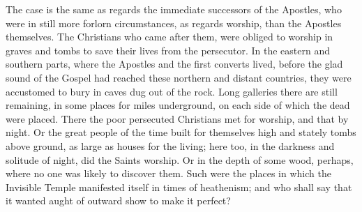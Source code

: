 The case is the same as regards the immediate successors of the
Apostles, who were in still more forlorn circumstances, as regards
worship, than the Apostles themselves. The Christians who came after
them, were obliged to worship in graves and tombs to save their lives
from the persecutor. In the eastern and southern parts, where the
Apostles and the first converts lived, before the glad sound of the
Gospel had reached these northern and distant countries, they were
accustomed to bury in caves dug out of the rock. Long galleries there
are still remaining, in some places for miles underground, on each
side of which the dead were placed. There the poor persecuted
Christians met for worship, and that by night. Or the great people of
the time built for themselves high and stately tombs above ground, as
large as houses for the living; here too, in the darkness and solitude
of night, did the Saints worship. Or in the depth of some wood,
perhaps, where no one was likely to discover them. Such were the
places in which the Invisible Temple manifested itself in times of
heathenism; and who shall say that it wanted aught of outward show to
make it perfect?

